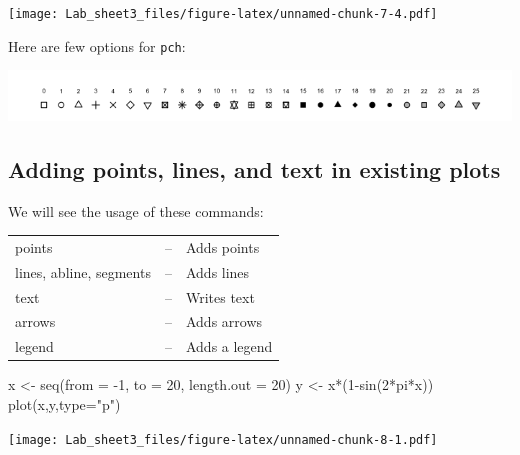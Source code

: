 \documentclass[
]{article}
\newenvironment{Shaded}{\begin{snugshade}}{\end{snugshade}}
\newcommand{\AttributeTok}[1]{\textcolor[rgb]{0.77,0.63,0.00}{#1}}
\newcommand{\DecValTok}[1]{\textcolor[rgb]{0.00,0.00,0.81}{#1}}
\newcommand{\FunctionTok}[1]{\textcolor[rgb]{0.00,0.00,0.00}{#1}}
\newcommand{\NormalTok}[1]{#1}
\newcommand{\OtherTok}[1]{\textcolor[rgb]{0.56,0.35,0.01}{#1}}
\newcommand{\SpecialCharTok}[1]{\textcolor[rgb]{0.00,0.00,0.00}{#1}}
\newcommand{\StringTok}[1]{\textcolor[rgb]{0.31,0.60,0.02}{#1}}
\theoremstyle{remark}
\begin{document}
\texttt{[image: Lab\_sheet3\_files/figure-latex/unnamed-chunk-7-4.pdf]}

Here are few options for \texttt{pch}:

\begin{center}
    \includegraphics[]{pch}
\end{center}

\hypertarget{adding-points-lines-and-text-in-existing-plots}{%
\subsection{Adding points, lines, and text in existing
plots}\label{adding-points-lines-and-text-in-existing-plots}}

We will see the usage of these commands:

\begin{center}
    \begin{tabular}{lcl}
    points &--& Adds points\\
lines, abline, segments &--& Adds lines\\
text &--& Writes text\\
arrows &--& Adds arrows\\
legend &--& Adds a legend
    \end{tabular}
\end{center}

\begin{Shaded}
\begin{Highlighting}[]
\NormalTok{x }\OtherTok{\textless{}{-}} \FunctionTok{seq}\NormalTok{(}\AttributeTok{from =} \SpecialCharTok{{-}}\DecValTok{1}\NormalTok{, }\AttributeTok{to =} \DecValTok{20}\NormalTok{,  }\AttributeTok{length.out =} \DecValTok{20}\NormalTok{)}
\NormalTok{y }\OtherTok{\textless{}{-}}\NormalTok{ x}\SpecialCharTok{*}\NormalTok{(}\DecValTok{1}\SpecialCharTok{{-}}\FunctionTok{sin}\NormalTok{(}\DecValTok{2}\SpecialCharTok{*}\NormalTok{pi}\SpecialCharTok{*}\NormalTok{x))}
\FunctionTok{plot}\NormalTok{(x,y,}\AttributeTok{type=}\StringTok{"p"}\NormalTok{)}
\end{Highlighting}
\end{Shaded}

\texttt{[image: Lab\_sheet3\_files/figure-latex/unnamed-chunk-8-1.pdf]}
\end{document}
